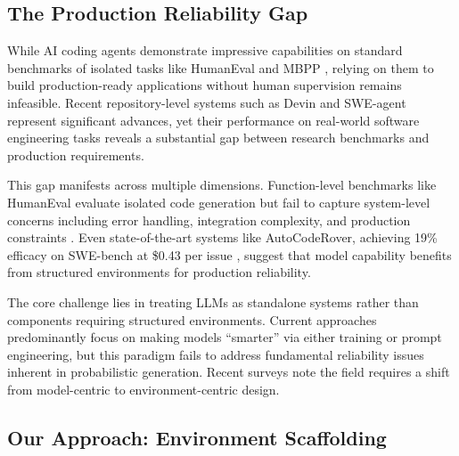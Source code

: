 \documentclass[conference]{IEEEtran}
\begin{document}

\subsection{The Production Reliability Gap}

While AI coding agents demonstrate impressive capabilities on standard benchmarks of isolated tasks like HumanEval \cite{chen2021evaluating} and MBPP \cite{austin2021program}, relying on them to build production-ready applications without human supervision remains infeasible. Recent repository-level systems such as Devin \cite{cognition2024swe} and SWE-agent \cite{yang2024swe} represent significant advances, yet their performance on real-world software engineering tasks reveals a substantial gap between research benchmarks and production requirements.

This gap manifests across multiple dimensions. Function-level benchmarks like HumanEval evaluate isolated code generation but fail to capture system-level concerns including error handling, integration complexity, and production constraints \cite{liu2023your}. Even state-of-the-art systems like AutoCodeRover, achieving 19\% efficacy on SWE-bench at \$0.43 per issue \cite{zhang2024autocoder}, suggest that model capability benefits from structured environments for production reliability.

The core challenge lies in treating LLMs as standalone systems rather than components requiring structured environments. Current approaches predominantly focus on making models ``smarter'' via either training or prompt engineering, but this paradigm fails to address fundamental reliability issues inherent in probabilistic generation. Recent surveys \cite{jiang2024survey,paul2024benchmarks} note the field requires a shift from model-centric to environment-centric design.

\subsection{Our Approach: Environment Scaffolding}
\end{document}
